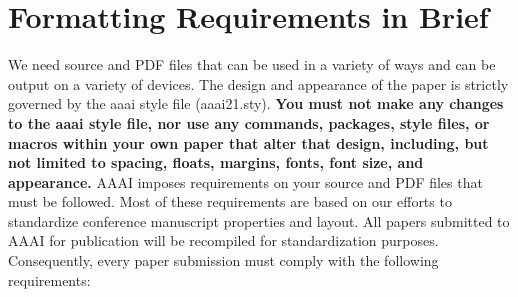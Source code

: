 \documentclass[letterpaper]{article} %
\begin{document}
\section{Formatting Requirements in Brief}
We need source and PDF files that can be used in a variety of ways and can be output on a variety of devices. The design and appearance of the paper is strictly governed by the aaai style file (aaai21.sty).
\textbf{You must not make any changes to the aaai style file, nor use any commands, packages, style files, or macros within your own paper that alter that design, including, but not limited to spacing, floats, margins, fonts, font size, and appearance.} AAAI imposes requirements on your source and PDF files that must be followed. Most of these requirements are based on our efforts to standardize conference manuscript properties and layout. All papers submitted to AAAI for publication will be recompiled for standardization purposes. Consequently, every paper submission must comply with the following requirements:
\end{document}
